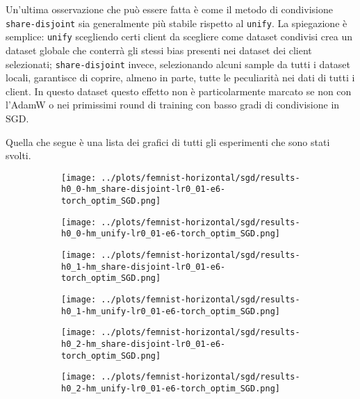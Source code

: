 Un'ultima osservazione che può essere fatta è come il metodo di condivisione
\texttt{share-disjoint} sia generalmente più stabile rispetto al 
\texttt{unify}. La spiegazione è semplice: \texttt{unify} scegliendo 
certi client da scegliere come dataset condivisi crea un dataset 
globale che conterrà gli stessi bias presenti nei dataset dei client 
selezionati; \texttt{share-disjoint} invece, selezionando alcuni sample 
da tutti i dataset locali, garantisce di coprire, almeno in parte, 
tutte le peculiarità nei dati di tutti i client. In questo dataset 
questo effetto non è particolarmente marcato se non con l'AdamW o nei 
primissimi round di training con basso gradi di condivisione in SGD.

Quella che segue è una lista dei grafici di tutti gli esperimenti
che sono stati svolti.
\begin{figure}[htbp]  %
    \centering
    \begin{subfigure}[b]{0.47\textwidth}
        \centering
        \texttt{[image: ../plots/femnist-horizontal/sgd/results-h0\_0-hm\_share-disjoint-lr0\_01-e6-torch\_optim\_SGD.png]}
    \end{subfigure}
    \hfill
    \begin{subfigure}[b]{0.47\textwidth}
        \centering
        \texttt{[image: ../plots/femnist-horizontal/sgd/results-h0\_0-hm\_unify-lr0\_01-e6-torch\_optim\_SGD.png]}
    \end{subfigure}
\end{figure}
\begin{figure}[htbp]  %
    \centering
    \begin{subfigure}[b]{0.47\textwidth}
        \centering
        \texttt{[image: ../plots/femnist-horizontal/sgd/results-h0\_1-hm\_share-disjoint-lr0\_01-e6-torch\_optim\_SGD.png]}
    \end{subfigure}
    \hfill
    \begin{subfigure}[b]{0.47\textwidth}
        \centering
        \texttt{[image: ../plots/femnist-horizontal/sgd/results-h0\_1-hm\_unify-lr0\_01-e6-torch\_optim\_SGD.png]}
    \end{subfigure}
\end{figure}
\begin{figure}[htbp]  %
    \centering
    \begin{subfigure}[b]{0.47\textwidth}
        \centering
        \texttt{[image: ../plots/femnist-horizontal/sgd/results-h0\_2-hm\_share-disjoint-lr0\_01-e6-torch\_optim\_SGD.png]}
    \end{subfigure}
    \hfill
    \begin{subfigure}[b]{0.47\textwidth}
        \centering
        \texttt{[image: ../plots/femnist-horizontal/sgd/results-h0\_2-hm\_unify-lr0\_01-e6-torch\_optim\_SGD.png]}
    \end{subfigure}
\end{figure}
